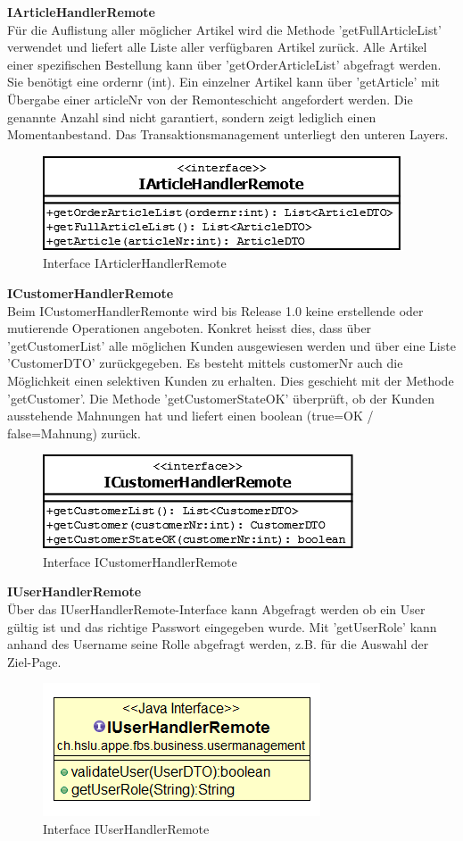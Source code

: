 \textbf{IArticleHandlerRemote}\\
Für die Auflistung aller möglicher Artikel wird die Methode 'getFullArticleList' verwendet und liefert alle Liste aller verfügbaren Artikel zurück. Alle Artikel einer spezifischen Bestellung kann über 'getOrderArticleList' abgefragt werden. Sie benötigt eine ordernr (int). Ein einzelner Artikel kann über 'getArticle' mit Übergabe einer articleNr von der Remonteschicht angefordert werden. Die genannte Anzahl sind nicht garantiert, sondern zeigt lediglich einen Momentanbestand. Das Transaktionsmanagement unterliegt den unteren Layers.
\begin{figure}[H]
	\includegraphics[width=0.6\linewidth]{Images/IArticleHandlerRemonte}
	\caption{Interface IArticlerHandlerRemote}
	\label{fig:if-IArticleHandlerRemote}
\end{figure}

\textbf{ICustomerHandlerRemote}\\
Beim ICustomerHandlerRemonte wird bis Release 1.0 keine erstellende oder mutierende Operationen angeboten. Konkret heisst dies, dass über 'getCustomerList' alle möglichen Kunden ausgewiesen werden und über eine Liste 'CustomerDTO' zurückgegeben. Es besteht mittels customerNr auch die Möglichkeit einen selektiven Kunden zu erhalten. Dies geschieht mit der Methode 'getCustomer'.
Die Methode 'getCustomerStateOK' überprüft, ob der Kunden ausstehende Mahnungen hat und liefert einen boolean (true=OK / false=Mahnung) zurück.
\begin{figure}[H]
	\includegraphics[width=0.4\linewidth]{Images/ICustomerHandlerRemonte}
	\caption{Interface ICustomerHandlerRemote}
	\label{fig:if-ICustomerHandlerRemote}
\end{figure}

\textbf{IUserHandlerRemote}\\
Über das IUserHandlerRemote-Interface kann Abgefragt werden ob ein User gültig ist und das richtige Passwort eingegeben wurde. Mit 'getUserRole' kann anhand des Username seine Rolle abgefragt werden, z.B. für die Auswahl der Ziel-Page. 
\begin{figure}[H]
	\includegraphics[width=0.4\linewidth]{Images/IUserHandlerRemonte}
	\caption{Interface IUserHandlerRemote}
	\label{fig:if-IUserHandlerRemote}
\end{figure}


